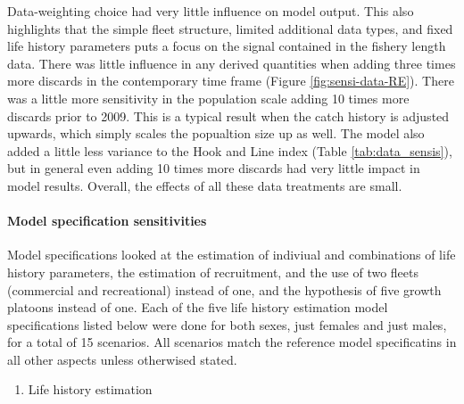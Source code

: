 \documentclass[11pt,
  english,
  a4paper,
]{article}
\begin{document}
Data-weighting choice had very little influence on model output. This also highlights that the simple fleet structure, limited additional data types, and fixed life history parameters puts a focus on the signal contained in the fishery length data. There was little influence in any derived quantities when adding three times more discards in the contemporary time frame (Figure \ref{fig:sensi-data-RE}). There was a little more sensitivity in the population scale adding 10 times more discards prior to 2009. This is a typical result when the catch history is adjusted upwards, which simply scales the popualtion size up as well. The model also added a little less variance to the Hook and Line index (Table \ref{tab:data_sensis}), but in general even adding 10 times more discards had very little impact in model results. Overall, the effects of all these data treatments are small.

\leavevmode\tagmcend\tagstructend\par


\hypertarget{model-specification-sensitivities}{%
\paragraph{Model specification sensitivities}\label{model-specification-sensitivities}}

\leavevmode\tagmcend\tagstructend


Model specifications looked at the estimation of indiviual and combinations of life history parameters, the estimation of recruitment, and the use of two fleets (commercial and recreational) instead of one, and the hypothesis of five growth platoons instead of one. Each of the five life history estimation model specifications listed below were done for both sexes, just females and just males, for a total of 15 scenarios. All scenarios match the reference model specificatins in all other aspects unless otherwised stated.

\leavevmode\tagmcend\tagstructend\par


\begin{enumerate}
\def\labelenumi{\arabic{enumi}.}
\item

  Life history estimation

  \tagmcend\tagstructend\tagstructend
\end{enumerate}
\end{document}
